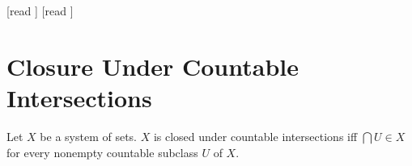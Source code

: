 \documentclass[10pt]{article}
\begin{document}
  \begin{imports}
    \begin{forthel}
      [read ]
      [read ]
    \end{forthel}
  \end{imports}


  \section*{Closure Under Countable Intersections}

  \begin{forthel}
    \begin{definition}[id=FOUNDATIONS_14_451771879129088,printid]
      Let $X$ be a system of sets.
      $X$ is closed under countable intersections iff $\bigcap U \in X$ for every nonempty countable subclass $U$ of $X$.
    \end{definition}
  \end{forthel}
\end{document}
